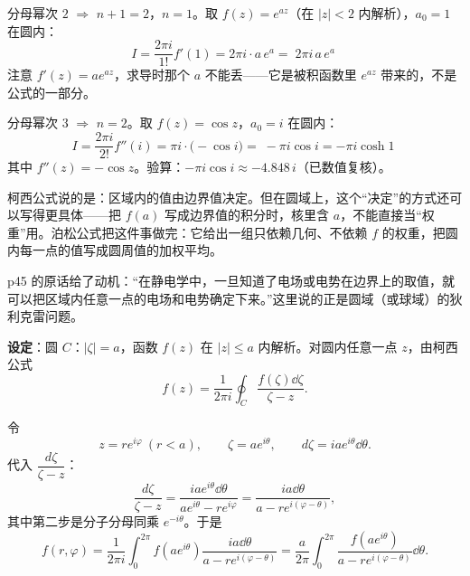 \documentclass[11pt]{ctexart}
\let\origsubhdr\subhdr
\renewcommand{\subhdr}[1]{\par\needspace{4\baselineskip}\origsubhdr{#1}}
\let\orighdr\hdr
\renewcommand{\hdr}[2]{\par\needspace{9\baselineskip}\orighdr{#1}{#2}}
\renewcommand{\qbreak}{\needspace{0.45\textheight}}
\begin{document}
\qbreak
{}

分母幂次 $2$ $\Rightarrow$ $n+1=2$，$n=1$。取 $f(z)=e^{az}$（在 $|z|<2$ 内解析），$a_0=1$ 在圆内：
\[ I=\frac{2\pi i}{1!}f'(1)=2\pi i\cdot a\,e^{a}=\boxed{\;2\pi i\,a\,e^{a}\;} \]
注意 $f'(z)=ae^{az}$，求导时那个 $a$ 不能丢——它是被积函数里 $e^{az}$ 带来的，不是公式的一部分。

\qbreak
{}

分母幂次 $3$ $\Rightarrow$ $n=2$。取 $f(z)=\cos z$，$a_0=i$ 在圆内：
\[ I=\frac{2\pi i}{2!}f''(i)=\pi i\cdot\bigl(-\cos i\bigr)=\boxed{\;-\pi i\cos i=-\pi i\cosh1\;} \]
其中 $f''(z)=-\cos z$。验算：$-\pi i\cos i\approx-4.848\,i$（已数值复核）。



\flowerrule



柯西公式说的是：区域内的值由边界值决定。但在圆域上，这个“决定”的方式还可以写得更具体——把 $f(a)$ 写成边界值的积分时，核里含 $a$，不能直接当“权重”用。泊松公式把这件事做完：它给出一组只依赖几何、不依赖 $f$ 的权重，把圆内每一点的值写成圆周值的加权平均。

p45 的原话给了动机：“在静电学中，一旦知道了电场或电势在边界上的取值，就可以把区域内任意一点的电场和电势确定下来。”这里说的正是圆域（或球域）的狄利克雷问题。

\textbf{设定}：圆 $C$：$|\zeta|=a$，函数 $f(z)$ 在 $|z|\le a$ 内解析。对圆内任意一点 $z$，由柯西公式
\[ f(z)=\frac{1}{2\pi i}\oint_C\frac{f(\zeta)\dd\zeta}{\zeta-z} . \]


令
\[ z=re^{i\varphi}\ (r<a),\qquad \zeta=ae^{i\theta},\qquad d\zeta=iae^{i\theta}\dd\theta . \]
代入 $\dfrac{d\zeta}{\zeta-z}$：
\[ \frac{d\zeta}{\zeta-z}=\frac{iae^{i\theta}\dd\theta}{ae^{i\theta}-re^{i\varphi}}
=\frac{ia\dd\theta}{a-re^{i(\varphi-\theta)}} , \]
其中第二步是分子分母同乘 $e^{-i\theta}$。于是
\begin{equation}\label{eq:polarcauchy}
f(r,\varphi)=\frac{1}{2\pi i}\int_0^{2\pi}f(ae^{i\theta})\frac{ia\dd\theta}{a-re^{i(\varphi-\theta)}}
=\frac{a}{2\pi}\int_0^{2\pi}\frac{f(ae^{i\theta})}{a-re^{i(\varphi-\theta)}}\dd\theta .
\end{equation}
\end{document}
